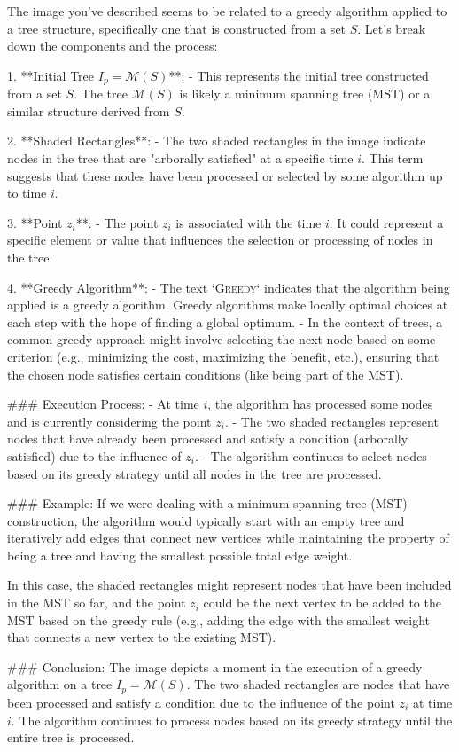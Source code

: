 The image you've described seems to be related to a greedy algorithm applied to a tree structure, specifically one that is constructed from a set \( S \). Let's break down the components and the process:

1. **Initial Tree \( I_p = \mathcal{M}(S) \)**:
   - This represents the initial tree constructed from a set \( S \). The tree \( \mathcal{M}(S) \) is likely a minimum spanning tree (MST) or a similar structure derived from \( S \).

2. **Shaded Rectangles**:
   - The two shaded rectangles in the image indicate nodes in the tree that are "arborally satisfied" at a specific time \( i \). This term suggests that these nodes have been processed or selected by some algorithm up to time \( i \).

3. **Point \( z_i \)**:
   - The point \( z_i \) is associated with the time \( i \). It could represent a specific element or value that influences the selection or processing of nodes in the tree.

4. **Greedy Algorithm**:
   - The text `\textsc{Greedy}\xspace` indicates that the algorithm being applied is a greedy algorithm. Greedy algorithms make locally optimal choices at each step with the hope of finding a global optimum.
   - In the context of trees, a common greedy approach might involve selecting the next node based on some criterion (e.g., minimizing the cost, maximizing the benefit, etc.), ensuring that the chosen node satisfies certain conditions (like being part of the MST).

### Execution Process:
- At time \( i \), the algorithm has processed some nodes and is currently considering the point \( z_i \).
- The two shaded rectangles represent nodes that have already been processed and satisfy a condition (arborally satisfied) due to the influence of \( z_i \).
- The algorithm continues to select nodes based on its greedy strategy until all nodes in the tree are processed.

### Example:
If we were dealing with a minimum spanning tree (MST) construction, the algorithm would typically start with an empty tree and iteratively add edges that connect new vertices while maintaining the property of being a tree and having the smallest possible total edge weight.

In this case, the shaded rectangles might represent nodes that have been included in the MST so far, and the point \( z_i \) could be the next vertex to be added to the MST based on the greedy rule (e.g., adding the edge with the smallest weight that connects a new vertex to the existing MST).

### Conclusion:
The image depicts a moment in the execution of a greedy algorithm on a tree \( I_p = \mathcal{M}(S) \). The two shaded rectangles are nodes that have been processed and satisfy a condition due to the influence of the point \( z_i \) at time \( i \). The algorithm continues to process nodes based on its greedy strategy until the entire tree is processed.